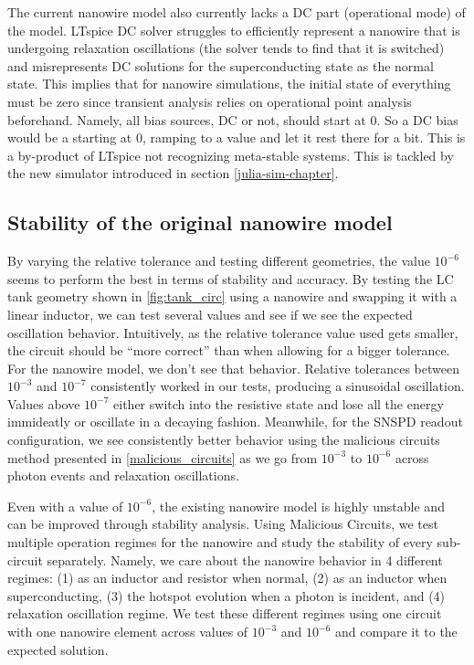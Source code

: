 The current nanowire model also currently lacks a DC part (operational mode) 
of the model.
LTspice DC solver struggles to efficiently represent a nanowire that is
undergoing relaxation oscillations (the solver tends to find that it is
switched) and misrepresents DC solutions for the superconducting state
as the normal state. This implies that for nanowire simulations,
the initial state of everything must be zero since transient analysis relies
on operational point analysis beforehand. Namely, all bias sources,
DC or not, should start at $0$. So a DC bias would be a  starting
at 0, ramping to a value and let it rest there for a bit. This is a by-product 
of LTspice not recognizing meta-stable systems. This is tackled by the new 
simulator introduced in section \ref{julia-sim-chapter}.

\subsection{Stability of the original nanowire model}

By varying the relative tolerance and testing different geometries, the value $10^{-6}$
seems to perform the best in terms of stability and accuracy. By testing the LC tank
geometry shown in \ref{fig:tank_circ} using a nanowire and swapping it with a linear 
inductor, we can test several  values and see if we see the expected 
oscillation behavior. Intuitively, as the relative tolerance value used gets smaller,
the circuit should be ``more correct'' than when allowing for a bigger tolerance.
For the nanowire model, we don't see that behavior. Relative tolerances between $10^{-3}$
and $10^{-7}$
consistently worked in our tests, producing a sinusoidal oscillation. Values
above $10^{-7}$ either switch into the resistive state and lose all the energy immideatly
or oscillate in a decaying fashion. Meanwhile, for the SNSPD readout configuration,
we see consistently better behavior using the malicious circuits method presented in
\ref{malicious_circuits} as we go from $10^{-3}$ to $10^{-6}$ across photon events
and relaxation oscillations.

Even with a  value of $10^{-6}$, the existing nanowire model is highly unstable
and can be improved through stability analysis.
Using Malicious Circuits, we test multiple operation regimes for
the nanowire and study the stability of every sub-circuit separately. Namely,
we care about the nanowire behavior in 4 different regimes: 
(1) as an inductor and resistor when normal, 
(2) as an inductor when superconducting, (3) the hotspot evolution when a photon is
incident, and (4) relaxation oscillation regime. We test these different regimes 
using one circuit with one nanowire element across  values of $10^{-3}$
and $10^{-6}$ and compare it to the expected solution.

